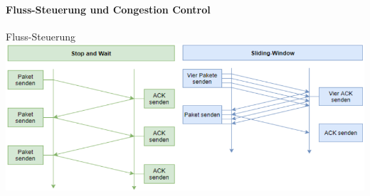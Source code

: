 \paragraph*{Fluss-Steuerung und Congestion Control}



\begin{concept}{Fluss-Steuerung}\\
    \includegraphics[width=1\linewidth]{fluss-steuerung.png}
\end{concept}

